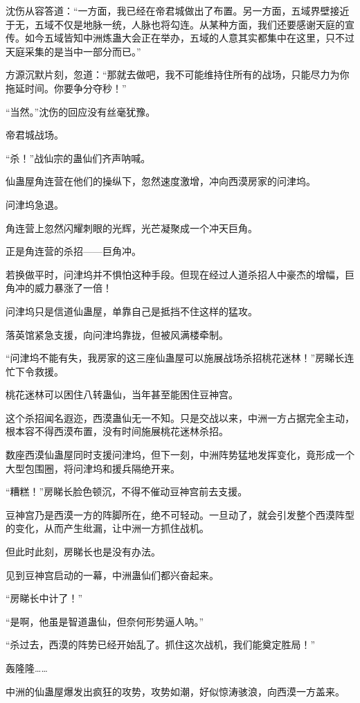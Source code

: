 \begin{this_body}
沈伤从容答道：“一方面，我已经在帝君城做出了布置。另一方面，五域界壁接近于无，五域不仅是地脉一统，人脉也将勾连。从某种方面，我们还要感谢天庭的宣传。如今五域皆知中洲炼蛊大会正在举办，五域的人意其实都集中在这里，只不过天庭采集的是当中一部分而已。”

方源沉默片刻，忽道：“那就去做吧，我不可能维持住所有的战场，只能尽力为你拖延时间。你要争分夺秒！”

“当然。”沈伤的回应没有丝毫犹豫。

帝君城战场。

“杀！”战仙宗的蛊仙们齐声呐喊。

仙蛊屋角连营在他们的操纵下，忽然速度激增，冲向西漠房家的问津坞。

问津坞急退。

角连营上忽然闪耀刺眼的光辉，光芒凝聚成一个冲天巨角。

正是角连营的杀招——巨角冲。

若换做平时，问津坞并不惧怕这种手段。但现在经过人道杀招人中豪杰的增幅，巨角冲的威力暴涨了一倍！

问津坞只是信道仙蛊屋，单靠自己是抵挡不住这样的猛攻。

落英馆紧急支援，向问津坞靠拢，但被风满楼牵制。

“问津坞不能有失，我房家的这三座仙蛊屋可以施展战场杀招桃花迷林！”房睇长连忙下令救援。

桃花迷林可以困住八转蛊仙，当年甚至能困住豆神宫。

这个杀招闻名遐迩，西漠蛊仙无一不知。只是交战以来，中洲一方占据完全主动，根本容不得西漠布置，没有时间施展桃花迷林杀招。

数座西漠仙蛊屋同时支援问津坞，但下一刻，中洲阵势猛地发挥变化，竟形成一个大型包围圈，将问津坞和援兵隔绝开来。

“糟糕！”房睇长脸色顿沉，不得不催动豆神宫前去支援。

豆神宫乃是西漠一方的阵脚所在，绝不可轻动。一旦动了，就会引发整个西漠阵型的变化，从而产生纰漏，让中洲一方抓住战机。

但此时此刻，房睇长也是没有办法。

见到豆神宫启动的一幕，中洲蛊仙们都兴奋起来。

“房睇长中计了！”

“是啊，他虽是智道蛊仙，但奈何形势逼人呐。”

“杀过去，西漠的阵势已经开始乱了。抓住这次战机，我们能奠定胜局！”

轰隆隆……

中洲的仙蛊屋爆发出疯狂的攻势，攻势如潮，好似惊涛骇浪，向西漠一方盖来。


\end{this_body}
